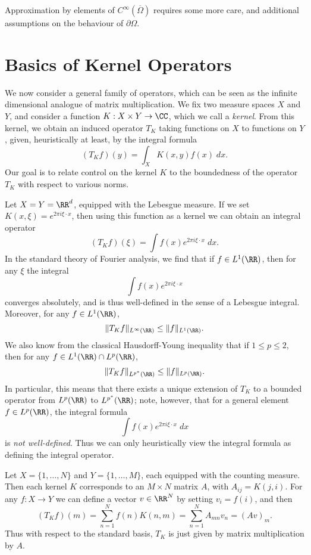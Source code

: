 Approximation by elements of $C^\infty(\overline{\Omega})$ requires some more care, and additional assumptions on the behaviour of $\partial \Omega$.











\chapter{Basics of Kernel Operators}

We now consider a general family of operators, which can be seen as the infinite dimensional analogue of matrix multiplication. We fix two measure spaces $X$ and $Y$, and consider a function $K: X \times Y \to \CC$, which we call a \emph{kernel}. From this kernel, we obtain an induced operator $T_K$ taking functions on $X$ to functions on $Y$, given, heuristically at least, by the integral formula
%
\[ (T_K f)(y) = \int_X K(x,y) f(x)\; dx. \]
%
Our goal is to relate control on the kernel $K$ to the boundedness of the operator $T_K$ with respect to various norms.

\begin{example}
  Let $X = Y = \RR^d$, equipped with the Lebesgue measure. If we set $K(x,\xi) = e^{2 \pi i \xi \cdot x}$, then using this function as a kernel we can obtain an integral operator
  \[ (T_K f)(\xi) = \int f(x) e^{2 \pi i \xi \cdot x}\; dx. \]
  In the standard theory of Fourier analysis, we find that if $f \in L^1(\RR)$, then for any $\xi$ the integral
  \[ \int f(x) e^{2 \pi i \xi \cdot x} \]
  converges absolutely, and is thus well-defined in the sense of a Lebesgue integral. Moreover, for any $f \in L^1(\RR)$,
  \[ \| T_K f \|_{L^\infty(\RR)} \leq \| f \|_{L^1(\RR)}. \]
  We also know from the classical Hausdorff-Young inequality that if $1 \leq p \leq 2$, then for any $f \in L^1(\RR) \cap L^p(\RR)$,
  \[ \| T_K f \|_{L^{p^*}(\RR)} \leq \| f \|_{L^p(\RR)}. \]
  In particular, this means that there exists a unique extension of $T_K$ to a bounded operator from $L^p(\RR)$ to $L^{p^*}(\RR)$; note, however, that for a general element $f \in L^p(\RR)$, the integral formula
  \[ \int f(x) e^{2 \pi i \xi \cdot x}\; dx \]
  is \emph{not well-defined}. Thus we can only heuristically view the integral formula as defining the integral operator.
\end{example}

\begin{example}
  Let $X = \{ 1, \dots, N \}$ and $Y = \{ 1, \dots, M \}$, each equipped with the counting measure. Then each kernel $K$ corresponds to an $M \times N$ matrix $A$, with $A_{ij} = K(j,i)$. For any $f: X \to Y$ we can define a vector $v \in \RR^N$ by setting $v_i = f(i)$, and then
  \[ (T_K f)(m) = \sum_{n = 1}^N f(n) K(n,m) = \sum_{n = 1}^N A_{mn} v_n = (Av)_m. \]
  Thus with respect to the standard basis, $T_K$ is just given by matrix multiplication by $A$.
\end{example}

